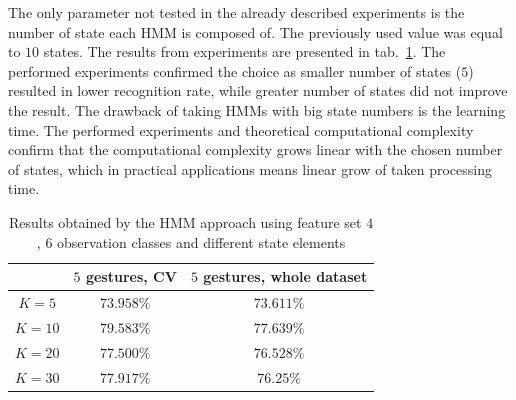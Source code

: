 The only parameter not tested in the already described experiments is the number of state each HMM is composed of. 
The previously used value was equal to $10$ states.
The results from experiments are presented in tab.~\ref{tab:dyn3}. 
The performed experiments confirmed the choice as smaller number of states ($5$) resulted in lower recognition rate, while greater number of states did not improve the result.
The drawback of taking HMMs with big state numbers is the learning time. 
The performed experiments and theoretical computational complexity confirm that the computational complexity grows linear with the chosen number of states, which in practical applications means linear grow of taken processing time.


\begin{table}[htp!]
	\label{tab:dyn3}
	\caption{Results obtained by the HMM approach using feature set $4$, $6$ observation classes and different state elements}
    \begin{tabular}{|c|c|c|}
    \hline
    ~                                 & $5$ gestures, CV & $5$ gestures, whole dataset  \\ \hline
	$K = 5$                  	  & $73.958\%$ & $73.611\%$   \\ \hline
    $K = 10$                     & $79.583\%$ & $77.639\%$   \\ \hline
    $K = 20$                    & $77.500\%$ & $76.528\%$   \\ \hline
    $K = 30$                     & $77.917\%$ & $76.25\%$   \\ \hline
    \end{tabular}
\end{table}

